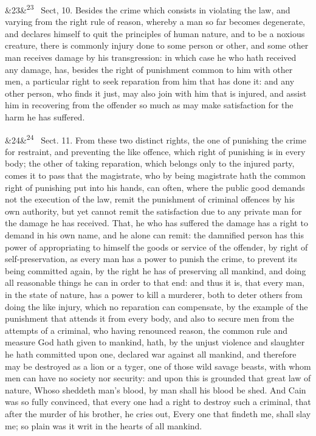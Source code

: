 \documentclass[12pt]{article}
\newcommand{\para}[1][]{\par\noindent\ifx&#1&\else\textsuperscript{\footnotesize #1}~\fi}
\begin{document}
\para[23] Sect, 10. Besides the crime which consists in violating the law, and varying from the right rule of reason, whereby a man so far becomes degenerate, and declares himself to quit the principles of human nature, and to be a noxious creature, there is commonly injury done to some person or other, and some other man receives damage by his transgression: in which case he who hath received any damage, has, besides the right of punishment common to him with other men, a particular right to seek reparation from him that has done it: and any other person, who finds it just, may also join with him that is injured, and assist him in recovering from the offender so much as may make satisfaction for the harm he has suffered.

\para[24] Sect. 11. From these two distinct rights, the one of punishing the crime for restraint, and preventing the like offence, which right of punishing is in every body; the other of taking reparation, which belongs only to the injured party, comes it to pass that the magistrate, who by being magistrate hath the common right of punishing put into his hands, can often, where the public good demands not the execution of the law, remit the punishment of criminal offences by his own authority, but yet cannot remit the satisfaction due to any private man for the damage he has received. That, he who has suffered the damage has a right to demand in his own name, and he alone can remit: the damnified person has this power of appropriating to himself the goods or service of the offender, by right of self-preservation, as every man has a power to punish the crime, to prevent its being committed again, by the right he has of preserving all mankind, and doing all reasonable things he can in order to that end: and thus it is, that every man, in the state of nature, has a power to kill a murderer, both to deter others from doing the like injury, which no reparation can compensate, by the example of the punishment that attends it from every body, and also to secure men from the attempts of a criminal, who having renounced reason, the common rule and measure God hath given to mankind, hath, by the unjust violence and slaughter he hath committed upon one, declared war against all mankind, and therefore may be destroyed as a lion or a tyger, one of those wild savage beasts, with whom men can have no society nor security: and upon this is grounded that great law of nature, Whoso sheddeth man's blood, by man shall his blood be shed. And Cain was so fully convinced, that every one had a right to destroy such a criminal, that after the murder of his brother, he cries out, Every one that findeth me, shall slay me; so plain was it writ in the hearts of all mankind.
\end{document}
